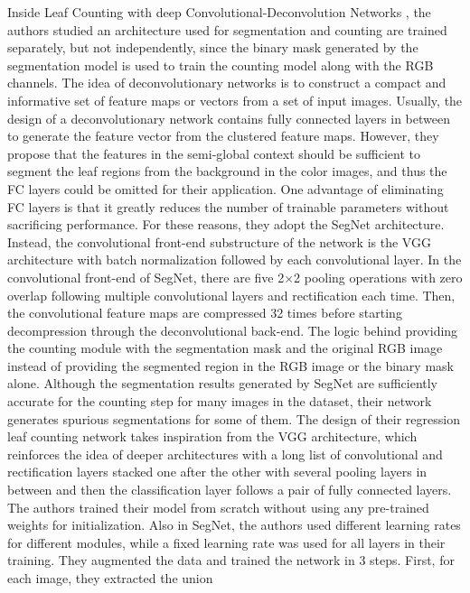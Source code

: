 Inside Leaf Counting with deep Convolutional-Deconvolution Networks \cite{Aich_2017_ICCV}, the authors studied an architecture used for segmentation and counting are trained separately, but not independently, since the binary mask generated by
the segmentation model is used to train the counting model along with the RGB channels. The idea of deconvolutionary networks is to construct a compact and informative
set of feature maps or vectors from a set of input images. Usually, the design of a deconvolutionary network contains fully connected layers in between to generate the
feature vector from the clustered feature maps. However, they propose that the features in the semi-global context should be sufficient to segment the leaf regions from 
the background in the color images, and thus the FC layers could be omitted for their application. One advantage of eliminating FC layers is that it greatly reduces the
number of trainable parameters without sacrificing performance. For these reasons, they adopt the SegNet\cite{badrinarayanan2017segnet} architecture. Instead, the convolutional front-end substructure
of the network is the VGG\cite{simonyan2014very} architecture with batch normalization followed by each convolutional layer. In the convolutional front-end of SegNet, there are five 2×2 pooling
operations with zero overlap following multiple convolutional layers and rectification each time. Then, the convolutional feature maps are compressed 32 times before
starting decompression through the deconvolutional back-end. The logic behind providing the counting module with the segmentation mask and the original RGB image instead
of providing the segmented region in the RGB image or the binary mask alone. Although the segmentation results generated by SegNet are sufficiently accurate for the
counting step for many images in the dataset, their network generates spurious segmentations for some of them. The design of their regression leaf counting network takes
inspiration from the VGG architecture, which reinforces the idea of deeper architectures with a long list of convolutional and rectification layers stacked one after
the other with several pooling layers in between and then the classification layer follows a pair of fully connected layers. The authors trained their model from
scratch without using any pre-trained weights for initialization. Also in SegNet, the authors used different learning rates for different modules, while a fixed
learning rate was used for all layers in their training. They augmented the data and trained the network in 3 steps. First, for each image, they extracted the union
